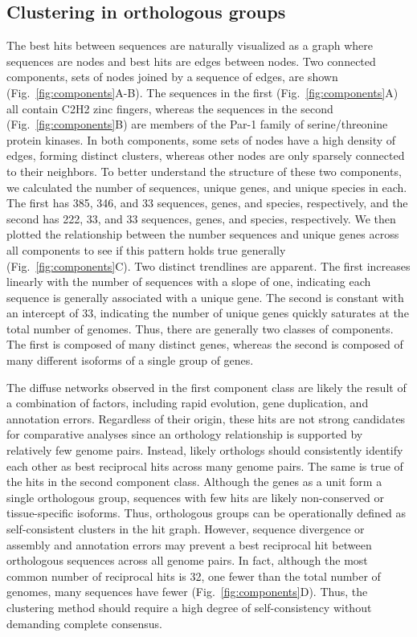 \subsection{Clustering in orthologous groups}
The best hits between sequences are naturally visualized as a graph where sequences are nodes and best hits are edges between nodes. Two connected components, sets of nodes joined by a sequence of edges, are shown (Fig.~\ref{fig:components}A-B). The sequences in the first (Fig.~\ref{fig:components}A) all contain C2H2 zinc fingers, whereas the sequences in the second (Fig.~\ref{fig:components}B) are members of the Par-1 family of serine/threonine protein kinases. In both components, some sets of nodes have a high density of edges, forming distinct clusters, whereas other nodes are only sparsely connected to their neighbors. To better understand the structure of these two components, we calculated the number of sequences, unique genes, and unique species in each. The first has 385, 346, and 33 sequences, genes, and species, respectively, and the second has 222, 33, and 33 sequences, genes, and species, respectively. We then plotted the relationship between the number sequences and unique genes across all components to see if this pattern holds true generally (Fig.~\ref{fig:components}C). Two distinct trendlines are apparent. The first increases linearly with the number of sequences with a slope of one, indicating each sequence is generally associated with a unique gene. The second is constant with an intercept of 33, indicating the number of unique genes quickly saturates at the total number of genomes. Thus, there are generally two classes of components. The first is composed of many distinct genes, whereas the second is composed of many different isoforms of a single group of genes.

The diffuse networks observed in the first component class are likely the result of a combination of factors, including rapid evolution, gene duplication, and annotation errors. Regardless of their origin, these hits are not strong candidates for comparative analyses since an orthology relationship is supported by relatively few genome pairs. Instead, likely orthologs should consistently identify each other as best reciprocal hits across many genome pairs. The same is true of the hits in the second component class. Although the genes as a unit form a single orthologous group, sequences with few hits are likely non-conserved or tissue-specific isoforms. Thus, orthologous groups can be operationally defined as self-consistent clusters in the hit graph. However, sequence divergence or assembly and annotation errors may prevent a best reciprocal hit between orthologous sequences across all genome pairs. In fact, although the most common number of reciprocal hits is 32, one fewer than the total number of genomes, many sequences have fewer (Fig.~\ref{fig:components}D). Thus, the clustering method should require a high degree of self-consistency without demanding complete consensus.

